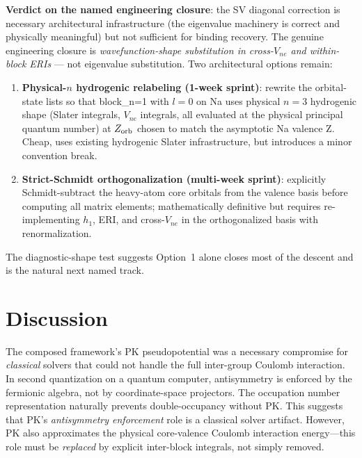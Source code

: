 \documentclass[aps,pra,twocolumn,superscriptaddress,longbibliography]{revtex4-2}
\begin{document}
\textbf{Verdict on the named engineering closure}: the SV diagonal
correction is necessary architectural infrastructure (the eigenvalue
machinery is correct and physically meaningful) but not sufficient
for binding recovery. The genuine engineering closure is
\emph{wavefunction-shape substitution in cross-$V_{ne}$ and
within-block ERIs} --- not eigenvalue substitution. Two architectural
options remain:
\begin{enumerate}
  \item \textbf{Physical-$n$ hydrogenic relabeling (1-week sprint)}:
    rewrite the orbital-state lists so that block\_n=1 with $l=0$ on
    Na uses physical $n=3$ hydrogenic shape (Slater integrals,
    $V_{ne}$ integrals, all evaluated at the physical principal
    quantum number) at $Z_{\rm orb}$ chosen to match the asymptotic
    Na valence Z. Cheap, uses existing hydrogenic Slater
    infrastructure, but introduces a minor convention break.
  \item \textbf{Strict-Schmidt orthogonalization (multi-week sprint)}:
    explicitly Schmidt-subtract the heavy-atom core orbitals from the
    valence basis before computing all matrix elements; mathematically
    definitive but requires re-implementing $h_1$, ERI, and cross-$V_{ne}$
    in the orthogonalized basis with renormalization.
\end{enumerate}
The diagnostic-shape test suggests Option~1 alone closes most of the
descent and is the natural next named track.

\section{Discussion}
\label{sec:discussion}

The composed framework's PK pseudopotential was a necessary compromise
for \emph{classical} solvers that could not handle the full
inter-group Coulomb interaction.  In second quantization on a quantum
computer, antisymmetry is enforced by the fermionic algebra, not by
coordinate-space projectors.  The occupation number representation
naturally prevents double-occupancy without PK.  This suggests that
PK's \emph{antisymmetry enforcement} role is a classical solver
artifact.  However, PK also approximates the physical core-valence
Coulomb interaction energy---this role must be \emph{replaced} by
explicit inter-block integrals, not simply removed.
\end{document}
